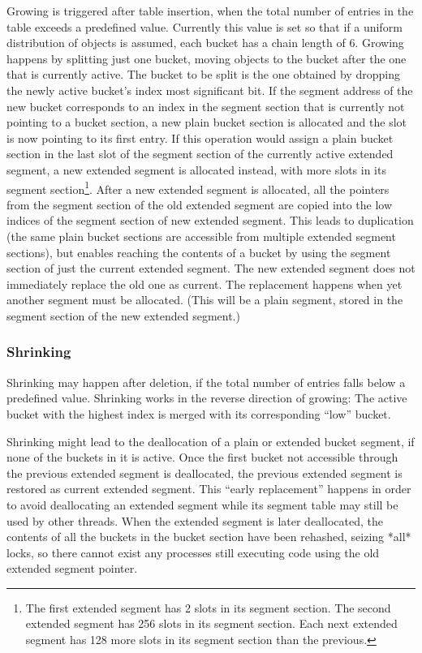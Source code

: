 \documentclass[aps,pre,preprint,nofootinbib]{revtex4}
\begin{document}
Growing is triggered after table insertion, when the total number of entries in the table exceeds a predefined value.
Currently this value is set so that if a uniform distribution of objects is assumed, each bucket has a chain length of 6.
Growing happens by splitting just one bucket, moving objects to the bucket after the one that is currently active.
The bucket to be split is the one obtained by dropping the newly active bucket's index most significant bit.
If the segment address of the new bucket corresponds to an index in the segment section that is currently not pointing to a bucket section, a new plain bucket section is allocated and the slot is now pointing to its first entry.
If this operation would assign a plain bucket section in the last slot of the segment section of the currently active extended segment, a new extended segment is allocated instead, with more slots in its segment section\footnote{
  The first extended segment has 2 slots in its segment section.
  The second extended segment has 256 slots in its segment section.
  Each next extended segment has 128 more slots in its segment section than the previous.
}.
After a new extended segment is allocated, all the pointers from the segment section of the old extended segment are copied into the low indices of the segment section of new extended segment.
This leads to duplication (the same plain bucket sections are accessible from multiple extended segment sections), but enables reaching the contents of a bucket by using the segment section of just the current extended segment.
The new extended segment does not immediately replace the old one as current.
The replacement happens when yet another segment must be allocated.
(This will be a plain segment, stored in the segment section of the new extended segment.)

\subsubsection{Shrinking}

Shrinking may happen after deletion, if the total number of entries falls below a predefined value.
Shrinking works in the reverse direction of growing:
The active bucket with the highest index is merged with its corresponding ``low'' bucket.

Shrinking might lead to the deallocation of a plain or extended bucket segment, if none of the buckets in it is active.
Once the first bucket not accessible through the previous extended segment is deallocated, the previous extended segment is restored as current extended segment.
This ``early replacement'' happens in order to avoid deallocating an extended segment while its segment table may still be used by other threads.
When the extended segment is later deallocated, the contents of all the buckets in the bucket section have been rehashed, seizing *all* locks, so there cannot exist any processes still executing code using the old extended segment pointer.
\end{document}
